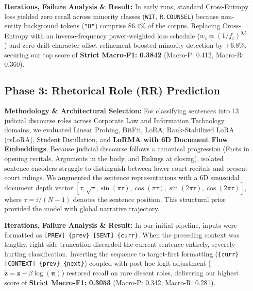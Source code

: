\documentclass[11pt, oneside]{article}
\begin{document}
\medskip
\noindent
\textbf{Iterations, Failure Analysis \& Result:} In early runs, standard Cross-Entropy loss yielded zero recall across minority classes (\texttt{WIT}, \texttt{R.COUNSEL}) because non-entity background tokens (\texttt{"O"}) comprise $86.4\%$ of the corpus. Replacing Cross-Entropy with an inverse-frequency power-weighted loss schedule ($w_c \propto (1/f_c)^{0.5}$) and zero-drift character offset refinement boosted minority detection by $+6.8\%$, securing our top score of \textbf{Strict Macro-F1: 0.3842} (Macro-P: 0.412, Macro-R: 0.360).

\subsection{Phase 3: Rhetorical Role (RR) Prediction}
\noindent
\textbf{Methodology \& Architectural Selection:} For classifying sentences into 13 judicial discourse roles across Corporate Law and Information Technology domains, we evaluated Linear Probing, BitFit, LoRA, Rank-Stabilized LoRA (rsLoRA), Student Distillation, and \textbf{LoRMA with 6D Document Flow Embeddings}. Because judicial discourse follows a canonical progression (Facts in opening recitals, Arguments in the body, and Rulings at closing), isolated sentence encoders struggle to distinguish between lower court recitals and present court rulings. We augmented the sentence representations with a 6D sinusoidal document depth vector $[\tau, \sqrt{\tau}, \sin(\pi \tau), \cos(\pi \tau), \sin(2\pi \tau), \cos(2\pi \tau)]$, where $\tau = i/(N-1)$ denotes the sentence position. This structural prior provided the model with global narrative trajectory.

\medskip
\noindent
\textbf{Iterations, Failure Analysis \& Result:} In our initial pipeline, inputs were formatted as \texttt{[PREV] \{prev\} [SENT] \{curr\}}. When the preceding context was lengthy, right-side truncation discarded the current sentence entirely, severely hurting classification. Inverting the sequence to target-first formatting (\texttt{\{curr\} [CONTEXT] \{prev\} \{next\}}) coupled with post-hoc logit adjustment ($\tilde{\mathbf{z}} = \mathbf{z} - \beta \log(\boldsymbol{\pi})$) restored recall on rare dissent roles, delivering our highest score of \textbf{Strict Macro-F1: 0.3053} (Macro-P: 0.342, Macro-R: 0.281).

\end{document}
